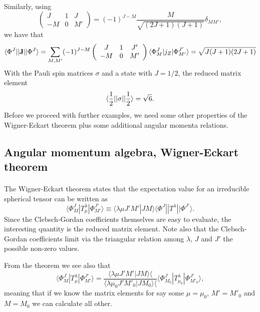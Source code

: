 \documentclass[%
twoside,                 %
final,                   %
10pt]{article}
\begin{document}
\paragraph{}
Similarly, using 
\[
\left(\begin{array}{ccc}  J & 1 & J \\ -M & 0 & M'\end{array}\right)=(-1)^{J-M}\frac{M}{\sqrt{(2J+1)(J+1)}}\delta_{MM'},
\]
we have that 
\[
\langle \Phi^J||{\bf J}||\Phi^{J}\rangle=\sum_{M,M'}(-1)^{J-M}\left(\begin{array}{ccc}  J & 1 & J' \\ -M & 0 & M'\end{array}\right)\langle \Phi^J_M|j_Z|\Phi^{J'}_{M'}\rangle=\sqrt{J(J+1)(2J+1)}
\]
With the Pauli spin matrices $\sigma$ and a state with $J=1/2$, the reduced matrix element
\[
\langle \frac{1}{2}||{\bf \sigma}||\frac{1}{2}\rangle=\sqrt{6}.
\] 
Before we proceed with further examples, we need some other properties of the Wigner-Eckart theorem plus some additional angular momenta relations.


\subsection*{Angular momentum algebra, Wigner-Eckart theorem}

\paragraph{}
The Wigner-Eckart theorem states that the  expectation value for an irreducible spherical tensor can be written as
\[
\langle \Phi^J_M|T^{\lambda}_{\mu}|\Phi^{J'}_{M'}\rangle\equiv\langle \lambda \mu J'M'|JM\rangle\langle \Phi^J||T^{\lambda}||\Phi^{J'}\rangle.
\]
Since the Clebsch-Gordan coefficients themselves are easy to evaluate, the interesting quantity is the reduced matrix element. Note also that 
the Clebsch-Gordan coefficients limit via the triangular relation among $\lambda$, $J$ and $J'$ the possible non-zero values.

From the theorem we see also that 
\[
\langle \Phi^J_M|T^{\lambda}_{\mu}|\Phi^{J'}_{M'}\rangle=\frac{\langle \lambda \mu J'M'|JM\rangle\langle }{\langle \lambda \mu_0 J'M'_0|JM_0\rangle\langle }\langle \Phi^J_{M_0}|T^{\lambda}_{\mu_0}|\Phi^{J'}_{M'_0}\rangle,
\]
meaning that if we know the matrix elements for say some $\mu=\mu_0$, $M'=M'_0$ and $M=M_0$ we can calculate all other.
\end{document}
